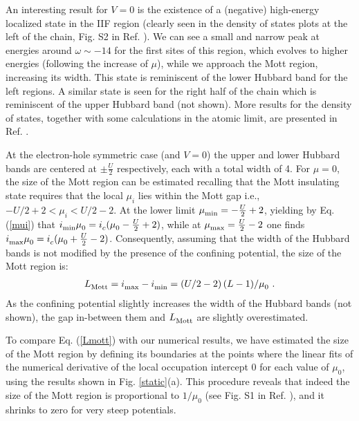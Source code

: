 \documentclass[aps,prl,showpacs,twocolumn,superscriptaddress]{revtex4-2}
\begin{document}


An interesting result for $V=0$ is the existence of a (negative) high-energy localized state in the IIF region (clearly seen in the density of states plots at the left of the chain, Fig. S2 in Ref. \cite{SM}). We can see a small and narrow peak at energies around $\omega \sim-14$ for the first sites of this region, which evolves to higher energies (following the increase of $\mu$),  while we approach the Mott region, increasing its width. This state is reminiscent of the lower Hubbard band for the left  regions. A similar state is seen for the right half of the chain which is reminiscent of the upper Hubbard band (not shown).  More results for the density of states, together with some calculations in the atomic limit, are presented in Ref. \cite{SM}.






\vspace{0.2cm}

 At the electron-hole symmetric case (and $V=0$) the upper and lower Hubbard bands are centered at $\pm \frac{U}{2}$ respectively, each with a total width of 4.
For $\mu=0$, the size of the Mott region can be estimated recalling that the Mott insulating state requires that the local $\mu_{i}$ lies within the Mott gap i.e., $-U/2+2 < \mu^{}_i < U/2-2$. At the lower limit $\mu^{}_{\rm min}=-\frac{U}{2}+2$, yielding by Eq. (\ref{mui})
that $i^{}_{\rm min}\mu^{}_{0}=i^{}_c(\mu^{}_{0}-\frac{U}{2}+2)$,
while at $\mu^{}_{\rm max}=\frac{U}{2}-2$ one finds
$i^{}_{\rm max}\mu^{}_{0}=i^{}_c(\mu^{}_{0}+\frac{U}{2}-2)$. Consequently, assuming that the width of the Hubbard bands is not modified by the presence of the confining potential, the size of the Mott region is:
\begin{align}
L^{}_{\rm Mott}=i^{}_{\rm max}-i^{}_{\rm min}=\left( U/2 - 2\right)(L-1)/\mu^{}_0\ .
\label{Lmott}
\end{align}
As the confining potential slightly increases the width of the Hubbard bands (not shown), the gap in-between them and $L^{}_{\rm Mott}$ are slightly overestimated.

To compare Eq. (\ref{Lmott}) with our numerical results, we have estimated the size of the Mott region by
defining its boundaries at the points where the linear fits of the numerical derivative of the local occupation
intercept $0$ for each value of  $\mu^{}_0$, using the results shown in Fig. \ref{static}(a). This procedure reveals that indeed  the size of the Mott region is proportional to $1/\mu^{}_0$ (see Fig. S1 in Ref. \cite{SM}), and it shrinks to zero for very steep potentials.
\end{document}
